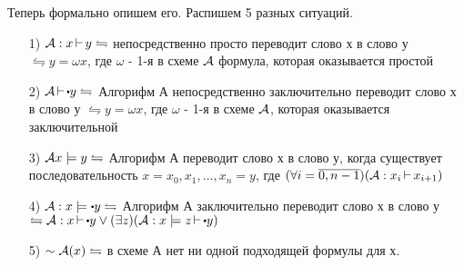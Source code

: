 \medskip

Теперь формально опишем его.
Распишем 5 разных ситуаций.

\begin{itemize}
    \item[1)] $ {\cal A}: x\operatorname{\vdash} y \leftrightharpoons$
        непосредственно просто переводит
        слово х в слово у $\leftrightharpoons y = \omega x$, где $\omega$ - 1-я в схеме  $ {\cal A}$ 
        формула, которая оказывается простой
    \item[2)] $ {\cal A} \step\bigcdot y \leftrightharpoons$
        Алгорифм А непосредственно заключительно переводит
        слово х в слово у $\leftrightharpoons y = \omega x$, где $\omega$ - 1-я в схеме
         $ {\cal A}$, которая оказывается заключительной
     \item[3)] $ {\cal A} x\models y \leftrightharpoons$
         Алгорифм А переводит слово х в слово у, когда
         существует последовательность $x=x_0,x_1,\ldots,x_{n}=y$, где
         $(\forall i=\overline{0,n-1})( {\cal A}:x_{i}\operatorname{\vdash} x_{i+1})$ 
     \item[4)] $ {\cal A}:x \models\bigcdot y \leftrightharpoons$
         Алгорифм А заключительно переводит слово х в слово у
         $\leftrightharpoons {\cal A}: x\step\bigcdot y \lor
         (\exists z)( {\cal A}:x \models z\step\bigcdot y )$ 
     \item[5)] $\sim {\cal A}(x) \leftrightharpoons$ в схеме А нет ни одной подходящей формулы для х.
\end{itemize}

